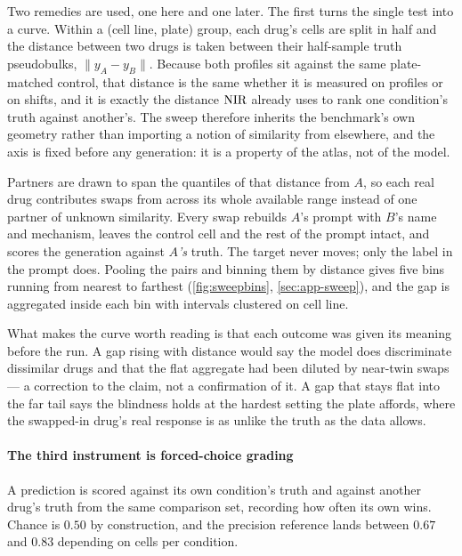Two remedies are used, one here and one later. The first turns the single test
into a curve. Within a (cell line, plate) group, each drug's cells are split in
half and the distance between two drugs is taken between their half-sample truth
pseudobulks, $\lVert y_A - y_B \rVert$. Because both profiles sit against the
same plate-matched control, that distance is the same whether it is measured on
profiles or on shifts, and it is exactly the distance $\textrm{NIR}$ already uses to rank
one condition's truth against another's. The sweep therefore inherits the
benchmark's own geometry rather than importing a notion of similarity from
elsewhere, and the axis is fixed before any generation: it is a property of the
atlas, not of the model.

Partners are drawn to span the quantiles of that distance from $A$, so each real
drug contributes swaps from across its whole available range instead of one
partner of unknown similarity. Every swap rebuilds $A$'s prompt with $B$'s name
and mechanism, leaves the control cell and the rest of the prompt intact, and
scores the generation against \emph{$A$'s} truth. The target never moves; only
the label in the prompt does. Pooling the pairs and binning them by distance
gives five bins running from nearest to farthest
(\cref{fig:sweepbins}, \cref{sec:app-sweep}), and the gap is aggregated inside
each bin with intervals clustered on cell line.

What makes the curve worth reading is that each outcome was given its meaning
before the run. A gap rising with distance would say the model does discriminate
dissimilar drugs and that the flat aggregate had been diluted by near-twin swaps
--- a correction to the claim, not a confirmation of it. A gap that stays flat
into the far tail says the blindness holds at the hardest setting the plate
affords, where the swapped-in drug's real response is as unlike the truth as the
data allows.

\paragraph{The third instrument is forced-choice grading} A prediction is scored
against its own condition's truth and against another drug's truth from the same
comparison set, recording how often its own wins. Chance is $0.50$ by
construction, and the precision reference lands between $0.67$ and $0.83$
depending on cells per condition.

